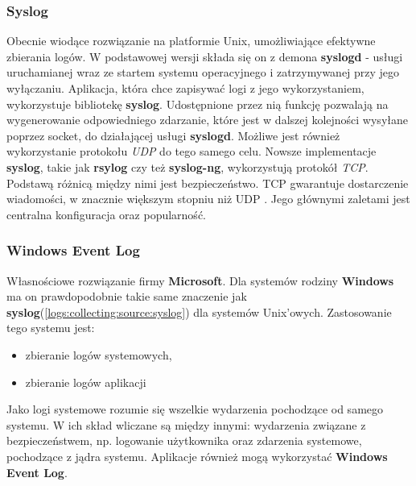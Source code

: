         \subsubsection{Syslog}
        \label{chapter:logs:collecting:source:syslog}
        Obecnie wiodące rozwiązanie na platformie Unix, umożliwiające efektywne zbierania logów. 
        W podstawowej wersji składa się on z demona \textbf{syslogd} - usługi
        uruchamianej wraz ze startem systemu operacyjnego i zatrzymywanej przy jego wyłączaniu. 
        Aplikacja, która chce zapisywać logi z jego wykorzystaniem, wykorzystuje bibliotekę \textbf{syslog}.
        Udostępnione przez nią funkcję pozwalają na wygenerowanie odpowiedniego zdarzanie, które jest
        w dalszej kolejności wysyłane poprzez socket, do działającej usługi \textbf{syslogd}. Możliwe jest
        również wykorzystanie protokołu \textit{UDP} do tego samego celu.
        Nowsze implementacje \textbf{syslog}, takie jak \textbf{rsylog} czy też \textbf{syslog-ng}, 
        wykorzystują protokół \textit{TCP}. Podstawą różnicą między nimi jest bezpieczeństwo. TCP
        gwarantuje dostarczenie wiadomości, w znacznie większym stopniu niż UDP \cite{logging_log_management}.
        Jego głównymi zaletami jest centralna konfiguracja oraz popularność.
        
        \subsubsection{Windows Event Log}
        \label{chapter:logs:collecting:source:windows_event_log}
        Własnościowe rozwiązanie firmy \textbf{Microsoft}. Dla systemów rodziny \textbf{Windows}
        ma on prawdopodobnie takie same znaczenie jak \textbf{syslog}(\ref{logs:collecting:source:syslog})
        dla systemów Unix'owych. Zastosowanie tego systemu jest:
        \begin{itemize}
            \item zbieranie logów systemowych,
            \item zbieranie logów aplikacji
        \end{itemize}
        Jako logi systemowe rozumie się wszelkie wydarzenia pochodzące od samego systemu. W ich skład
        wliczane są między innymi: wydarzenia związane z bezpieczeństwem, np. 
        logowanie użytkownika oraz zdarzenia systemowe, pochodzące z jądra systemu. Aplikacje
        również mogą wykorzystać \textbf{Windows Event Log}.
        
